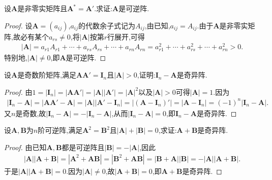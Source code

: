 \documentclass[../../main.tex]{subfiles}%
\begin{document}
\begin{example}
设\(\boldsymbol{A}\)是非零实矩阵且\(\boldsymbol{A}^* = \boldsymbol{A}'\).求证:\(\boldsymbol{A}\)是可逆阵.
\end{example}
\begin{proof}
设\(\boldsymbol{A} = (a_{ij})\),\(a_{ij}\)的代数余子式记为\(A_{ij}\),由已知,\(a_{ij} = A_{ij}\).由于\(\boldsymbol{A}\)是非零实矩阵,故必有某个\(a_{rs} \neq 0\),将\(|\boldsymbol{A}|\)按第\(r\)行展开,可得
\begin{align*}
|\boldsymbol{A}| = a_{r1}A_{r1} + \cdots + a_{rs}A_{rs} + \cdots + a_{rn}A_{rn} = a_{r1}^2 + \cdots + a_{rs}^2 + \cdots + a_{rn}^2 > 0.
\end{align*}
特别地,\(|\boldsymbol{A}| \neq 0\),即\(\boldsymbol{A}\)是可逆阵.
\end{proof}

\begin{example}
设\(\boldsymbol{A}\)是奇数阶矩阵,满足\(\boldsymbol{A}\boldsymbol{A}' = \boldsymbol{I}_{n}\)且\(|\boldsymbol{A}| > 0\),证明:\(\boldsymbol{I}_{n} - \boldsymbol{A}\)是奇异阵.
\end{example}
\begin{proof}
由\(1 = |\boldsymbol{I}_{n}| = |\boldsymbol{A}\boldsymbol{A}'| = |\boldsymbol{A}||\boldsymbol{A}'| = |\boldsymbol{A}|^{2}\)以及\(|\boldsymbol{A}| > 0\)可得\(|\boldsymbol{A}| = 1\).因为
\begin{align*}
|\boldsymbol{I}_{n} - \boldsymbol{A}| = |\boldsymbol{A}\boldsymbol{A}' - \boldsymbol{A}| = |\boldsymbol{A}||\boldsymbol{A}' - \boldsymbol{I}_{n}| = |(\boldsymbol{A} - \boldsymbol{I}_{n})'| = |\boldsymbol{A} - \boldsymbol{I}_{n}| = (-1)^{n}|\boldsymbol{I}_{n} - \boldsymbol{A}|.
\end{align*}
又\(n\)是奇数,故\(|\boldsymbol{I}_{n} - \boldsymbol{A}| = -|\boldsymbol{I}_{n} - \boldsymbol{A}|\),从而\(|\boldsymbol{I}_{n} - \boldsymbol{A}| = 0\),即\(\boldsymbol{I}_{n} - \boldsymbol{A}\)是奇异阵.
\end{proof}

\begin{example}
设\(\boldsymbol{A},\boldsymbol{B}\)为\(n\)阶可逆阵,满足\(\boldsymbol{A}^{2} = \boldsymbol{B}^{2}\)且\(|\boldsymbol{A}| + |\boldsymbol{B}| = 0\),求证:\(\boldsymbol{A} + \boldsymbol{B}\)是奇异阵.
\end{example}
\begin{proof}
由已知\(\boldsymbol{A},\boldsymbol{B}\)都是可逆阵且\(|\boldsymbol{B}| = -|\boldsymbol{A}|\),因此
\begin{align*}
|\boldsymbol{A}||\boldsymbol{A} + \boldsymbol{B}| = |\boldsymbol{A}^{2} + \boldsymbol{A}\boldsymbol{B}| = |\boldsymbol{B}^{2} + \boldsymbol{A}\boldsymbol{B}| = |\boldsymbol{B} + \boldsymbol{A}||\boldsymbol{B}| = -|\boldsymbol{A}||\boldsymbol{A} + \boldsymbol{B}|.
\end{align*}
于是\(|\boldsymbol{A}||\boldsymbol{A} + \boldsymbol{B}| = 0\).因为\(|\boldsymbol{A}| \neq 0\),故\(|\boldsymbol{A} + \boldsymbol{B}| = 0\),即\(\boldsymbol{A} + \boldsymbol{B}\)是奇异阵.
\end{proof}
\end{document}

